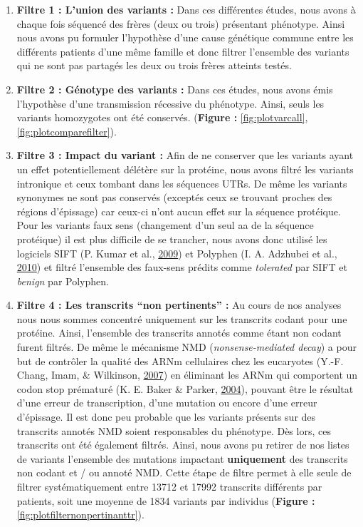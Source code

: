 \documentclass[12pt,twoside]{reedthesis}
\providecommand{\tightlist}{%
  \setlength{\itemsep}{0pt}\setlength{\parskip}{0pt}}
\theoremstyle{definition}
\theoremstyle{definition}
\theoremstyle{remark}
\begin{document}
  \begin{enumerate}
  \def\labelenumi{\arabic{enumi}.}
  \tightlist
  \item
    \textbf{Filtre 1 : L'union des variants :} Dans ces différentes
    études, nous avons à chaque fois séquencé des frères (deux ou trois)
    présentant phénotype. Ainsi nous avons pu formuler l'hypothèse d'une
    cause génétique commune entre les différents patients d'une même
    famille et donc filtrer l'ensemble des variants qui ne sont pas
    partagés les deux ou trois frères atteints testés.\\
  \item
    \textbf{Filtre 2 : Génotype des variants :} Dans ces études, nous
    avons émis l'hypothèse d'une transmission récessive du phénotype.
    Ainsi, seuls les variants homozygotes ont été conservés.
    (\textbf{Figure : }\ref{fig:plotvarcall},
    \ref{fig:plotcomparefilter}).\\
  \item
    \textbf{Filtre 3 : Impact du variant :} Afin de ne conserver que les
    variants ayant un effet potentiellement délétère sur la protéine, nous
    avons filtré les variants intronique et ceux tombant dans les
    séquences UTRs. De même les variants synonymes ne sont pas conservés
    (exceptés ceux se trouvant proches des régions d'épissage) car ceux-ci
    n'ont aucun effet sur la séquence protéique. Pour les variants faux
    sens (changement d'un seul aa de la séquence protéique) il est plus
    difficile de se trancher, nous avons donc utilisé les logiciels SIFT
    (P. Kumar et al., \protect\hyperlink{ref-Kumar2009}{2009}) et Polyphen
    (I. A. Adzhubei et al., \protect\hyperlink{ref-Adzhubei2010}{2010}) et
    filtré l'ensemble des faux-sens prédits comme \emph{tolerated} par
    SIFT et \emph{benign} par Polyphen.\\
  \item
    \textbf{Filtre 4 : Les transcrits ``non pertinents'' :} Au cours de
    nos analyses nous nous sommes concentré uniquement sur les transcrits
    codant pour une protéine. Ainsi, l'ensemble des transcrits annotés
    comme étant non codant furent filtrés. De même le mécanisme NMD
    (\emph{nonsense-mediated decay}) a pour but de contrôler la qualité
    des ARNm cellulaires chez les eucaryotes (Y.-F. Chang, Imam, \&
    Wilkinson, \protect\hyperlink{ref-Chang2007}{2007}) en éliminant les
    ARNm qui comportent un codon stop prématuré (K. E. Baker \& Parker,
    \protect\hyperlink{ref-Baker2004}{2004}), pouvant être le résultat
    d'une erreur de transcription, d'une mutation ou encore d'une erreur
    d'épissage. Il est donc peu probable que les variants présents sur des
    transcrits annotés NMD soient responsables du phénotype. Dès lors, ces
    transcrits ont été également filtrés. Ainsi, nous avons pu retirer de
    nos listes de variants l'ensemble des mutations impactant
    \textbf{uniquement} des transcrits non codant et / ou annoté NMD.
    Cette étape de filtre permet à elle seule de filtrer systématiquement
    entre 13712 et 17992 transcrits différents par patients, soit une
    moyenne de 1834 variants par individus (\textbf{Figure :
    }\ref{fig:plotfilternonpertinanttr}).
  \end{enumerate}
  
\end{document}
